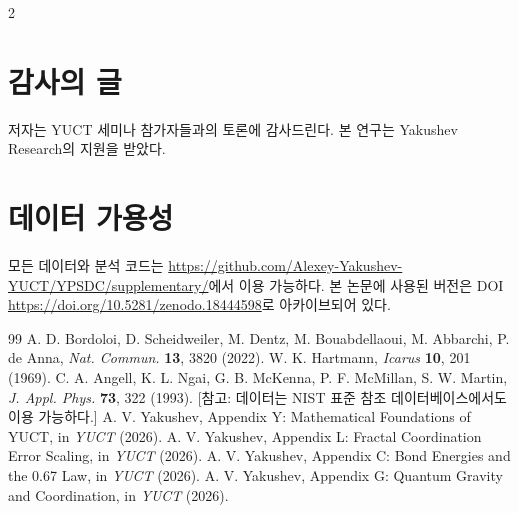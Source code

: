 \documentclass[11pt,a4paper]{article}
\begin{document}
\begin{multicols}{2}
		\section*{감사의 글}
		
		저자는 YUCT 세미나 참가자들과의 토론에 감사드린다. 본 연구는 Yakushev Research의 지원을 받았다.
		
		\section*{데이터 가용성}
		모든 데이터와 분석 코드는 \url{https://github.com/Alexey-Yakushev-YUCT/YPSDC/supplementary/}에서 이용 가능하다. 본 논문에 사용된 버전은 DOI \url{https://doi.org/10.5281/zenodo.18444598}로 아카이브되어 있다.
		
		\begin{thebibliography}{99}
			 A. D. Bordoloi, D. Scheidweiler, M. Dentz, M. Bouabdellaoui, M. Abbarchi, P. de Anna, \emph{Nat. Commun.} \textbf{13}, 3820 (2022).
			 W. K. Hartmann, \emph{Icarus} \textbf{10}, 201 (1969).
			 C. A. Angell, K. L. Ngai, G. B. McKenna, P. F. McMillan, S. W. Martin, \emph{J. Appl. Phys.} \textbf{73}, 322 (1993). [참고: 데이터는 NIST 표준 참조 데이터베이스에서도 이용 가능하다.]
			 A. V. Yakushev, Appendix Y: Mathematical Foundations of YUCT, in \emph{YUCT} (2026).
			 A. V. Yakushev, Appendix L: Fractal Coordination Error Scaling, in \emph{YUCT} (2026).
			 A. V. Yakushev, Appendix C: Bond Energies and the 0.67 Law, in \emph{YUCT} (2026).
			 A. V. Yakushev, Appendix G: Quantum Gravity and Coordination, in \emph{YUCT} (2026).
		\end{thebibliography}
		
	\end{multicols}
\end{document}
